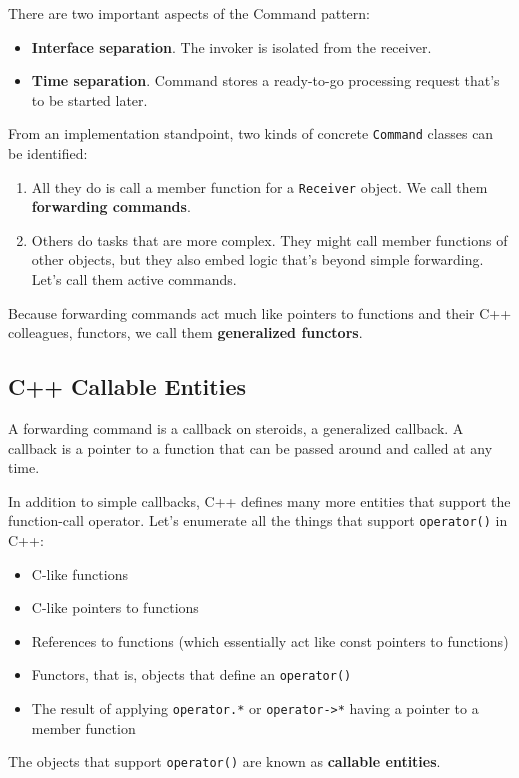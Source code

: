 There are two important aspects of the Command pattern:
\begin{itemize}
\item \textbf{Interface separation}. The invoker is isolated from the
  receiver. 
\item \textbf{Time separation}. Command stores a ready-to-go
  processing request that's to be started later.
\end{itemize}

From an implementation standpoint, two kinds of concrete \texttt{Command}
classes can be identified:
\begin{enumerate}
\item All they do is call a member function for a \texttt{Receiver}
  object. We call them \textbf{forwarding commands}.
\item Others do tasks that are more complex. They might call member
functions of other objects, but they also embed logic that's beyond
simple forwarding. Let's call them active commands\textbf{}. 
\end{enumerate}
Because forwarding commands act much
like pointers to functions and their C++ colleagues, functors, we call
them \textbf{generalized functors}. 

\subsection{C++ Callable Entities}

A forwarding command is a callback on steroids, a generalized
callback. A callback is a pointer to a function that can be passed
around and called at any time.

In addition to simple callbacks, C++ defines many more entities that
support the function-call operator.  Let's enumerate all the things
that support \texttt{operator()} in C++:
\begin{itemize}
\item C-like functions
\item C-like pointers to functions
\item References to functions (which essentially act like const
  pointers to functions)
\item Functors, that is, objects that define an \texttt{operator()}
\item The result of applying \texttt{operator.*} or
  \texttt{operator->*} having a pointer to a member function
\end{itemize}
The objects that support \texttt{operator()} are known as
\textbf{callable entities}.

